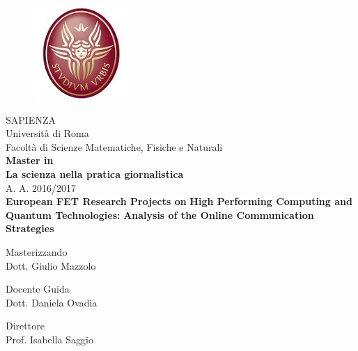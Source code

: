 \begin{titlepage}
 
 \begin{figure}[!t] 
   \begin{center}
   \includegraphics[scale=0.3]{Images/Logo_sapienza.jpg}
   \end{center}
 \end{figure}  
 
 \begin{center}
   SAPIENZA \\
   Universit\`a di Roma \\
   Facolt\`a di Scienze Matematiche, Fisiche e Naturali \\
   \vspace{10mm}
   \textbf{Master in} \\
   \textbf{La scienza nella pratica giornalistica}\\
   A. A. 2016/2017 \\
   \vspace{10mm}
   \textbf{European FET Research Projects on}
   \textbf{High Performing Computing and Quantum Technologies:}
   \textbf{Analysis of the Online Communication Strategies}\\
 \end{center} 

 \vspace{10mm}

 \begin{center}
   Masterizzando\\
   Dott. Giulio Mazzolo
 \end{center}

 \vspace{10mm}

 \begin{flushleft}
   Docente Guida\\ 
   Dott. Daniela Ovadia
 \end{flushleft}
 
 \begin{flushright}
   Direttore \, \, \, \, \, \, \\ 
   Prof. Isabella Saggio
 \end{flushright}
 
 \newpage
 \thispagestyle{empty} 
 


\end{titlepage}
